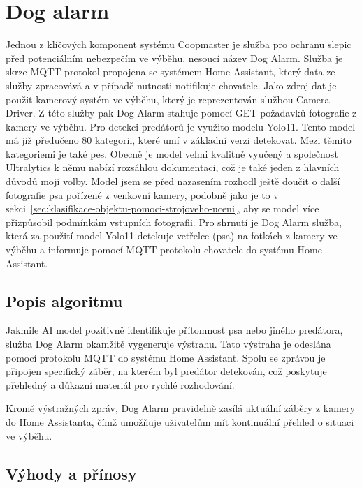 \section{Dog alarm}\label{sec:dog-alarm}
Jednou z klíčových komponent systému Coopmaster je služba pro ochranu slepic před potenciálním nebezpečím ve výběhu, nesoucí název Dog Alarm.\newline
Služba je skrze MQTT protokol propojena se systémem Home Assistant, který data ze služby zpracovává a v případě nutnosti notifikuje chovatele.
Jako zdroj dat je použit kamerový systém ve výběhu, který je reprezentován službou Camera Driver.
Z této služby pak Dog Alarm stahuje pomocí GET požadavků fotografie z kamery ve výběhu.\newline
Pro detekci predátorů je využito modelu Yolo11.
Tento model má již předučeno 80 kategorii, které umí v základní verzi detekovat.
Mezi těmito kategoriemi je také pes.
Obecně je model velmi kvalitně vyučený a společnost Ultralytics k němu nabízí rozsáhlou dokumentaci, což je také jeden z hlavních důvodů mojí volby.
Model jsem se před nazasením rozhodl ještě doučit o další fotografie psa pořízené z venkovní kamery, podobně jako je to v sekci~\ref{sec:klasifikace-objektu-pomoci-strojoveho-uceni}, aby se model více přizpůsobil podmínkám vstupních fotografii.\newline
Pro shrnutí je Dog Alarm služba, která za použití model Yolo11 detekuje vetřelce (psa) na fotkách z kamery ve výběhu a informuje pomocí MQTT protokolu chovatele do systému Home Assistant.

\subsection*{Popis algoritmu}
Jakmile AI model pozitivně identifikuje přítomnost psa nebo jiného predátora, služba Dog Alarm okamžitě vygeneruje výstrahu.
Tato výstraha je odeslána pomocí protokolu MQTT do systému Home Assistant.
Spolu se zprávou je připojen specifický záběr, na kterém byl predátor detekován, což poskytuje přehledný a důkazní materiál pro rychlé rozhodování.

Kromě výstražných zpráv, Dog Alarm pravidelně zasílá aktuální záběry z kamery do Home Assistanta, čímž umožňuje uživatelům mít kontinuální přehled o situaci ve výběhu.

\subsection*{Výhody a přínosy}

